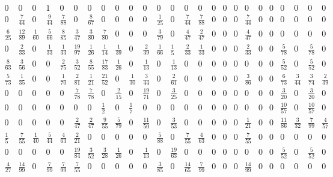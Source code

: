 \documentclass[11pt]{report}
\begin{document}
\begin{appendices}
\begin{figure} [H]
\begin{equation*}
\begin{array}{ccccccccccccccccccccccccc}
0&0&0&1&0&0&0&0&0&0&0&0&0&0&0&0&0&0&0&0&0&0&0&0&0\\

0&\frac{7}{44}&0&\frac{9}{44}&\frac{7}{88}&0&\frac{8}{67}&0&0&0&0&\frac{1}{25}&0&\frac{7}{44}&\frac{7}{88}&0&0&0&\frac{7}{44}&0&0&0&0&0&0\\

\frac{6}{25}&\frac{12}{89}&\frac{1}{60}&\frac{5}{66}&\frac{8}{85}&\frac{3}{47}&\frac{3}{80}&\frac{7}{80}&0&0&0&\frac{3}{79}&0&\frac{4}{47}&\frac{2}{47}&0&0&0&\frac{4}{47}&0&0&0&0&0&0\\

0&\frac{2}{33}&0&\frac{1}{33}&\frac{1}{33}&\frac{19}{97}&\frac{1}{26}&\frac{1}{14}&\frac{1}{39}&0&\frac{2}{39}&\frac{1}{66}&\frac{1}{5}&\frac{2}{33}&\frac{1}{33}&0&0&0&\frac{2}{33}&0&0&\frac{5}{78}&0&\frac{5}{78}&0\\

\frac{8}{63}&\frac{3}{56}&0&0&\frac{2}{75}&\frac{3}{52}&\frac{8}{55}&\frac{17}{83}&\frac{1}{26}&0&\frac{1}{13}&0&\frac{1}{13}&0&0&0&0&0&0&0&0&\frac{5}{52}&0&\frac{5}{52}&0\\

\frac{5}{73}&\frac{1}{35}&0&0&\frac{1}{70}&\frac{2}{81}&\frac{1}{21}&\frac{21}{52}&0&\frac{1}{30}&\frac{3}{44}&0&\frac{2}{61}&0&0&0&0&0&\frac{3}{86}&0&0&\frac{6}{73}&\frac{3}{44}&\frac{3}{74}&\frac{2}{39}\\

0&0&0&0&0&\frac{7}{78}&\frac{7}{78}&0&\frac{2}{15}&0&\frac{19}{71}&0&\frac{3}{25}&0&0&0&0&0&0&0&0&\frac{3}{20}&0&\frac{3}{20}&0\\

0&0&0&0&0&0&0&\frac{1}{2}&0&\frac{1}{7}&0&0&0&0&0&0&0&0&0&0&0&\frac{10}{57}&0&\frac{10}{57}&0\\

0&0&0&0&0&\frac{2}{47}&\frac{2}{47}&\frac{9}{55}&\frac{5}{79}&0&\frac{11}{50}&0&\frac{3}{53}&0&0&0&0&0&\frac{1}{21}&0&0&\frac{11}{86}&\frac{3}{32}&\frac{7}{99}&\frac{4}{57}\\

\frac{1}{5}&\frac{7}{55}&\frac{1}{40}&\frac{5}{44}&\frac{4}{63}&\frac{2}{21}&0&0&0&0&0&\frac{5}{88}&0&\frac{7}{55}&\frac{4}{63}&0&0&0&\frac{7}{55}&0&0&0&0&0&0\\

0&0&0&0&0&\frac{19}{84}&\frac{3}{52}&\frac{3}{28}&\frac{1}{26}&0&\frac{1}{13}&0&\frac{19}{63}&0&0&0&0&0&0&0&0&\frac{5}{52}&0&\frac{5}{52}&0\\

\frac{4}{27}&\frac{14}{99}&0&\frac{7}{99}&\frac{7}{99}&\frac{7}{55}&0&0&0&0&0&\frac{3}{85}&0&\frac{14}{65}&\frac{7}{99}&0&0&0&\frac{14}{99}&0&0&0&0&0&0\\


\end{array}
\end{equation*}
\end{figure}
\end{appendices}
\end{document}
